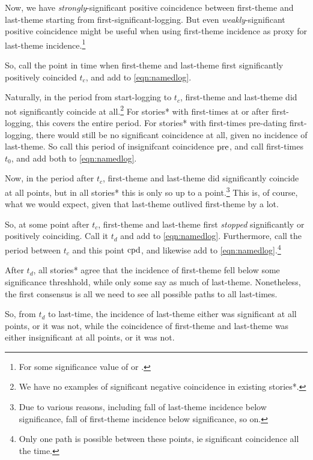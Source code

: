 			Now, we have \emph{strongly}-significant positive coincidence between first-theme and last-theme starting from first-significant-logging. But even \emph{weakly}-significant positive coincidence might be useful when using first-theme incidence as proxy for last-theme incidence.\footnote{For some significance value of  or .}
			
			So, call the point in time when first-theme and last-theme first significantly positively coincided \(t_c\), and add to \ref{eqn:namedlog}.
			
			Naturally, in the period from start-logging to \(t_c\), first-theme and last-theme did not significantly coincide at all.\footnote{We have no examples of significant negative coincidence in existing stories*.} For stories* with first-times at or after first-logging, this covers the entire period. For stories* with first-times pre-dating first-logging, there would still be no significant coincidence at all, given no incidence of last-theme. So call this period of insignifcant coincidence \(\operatorname{pre}\), and call first-times \(t_0\), and add both to \ref{eqn:namedlog}.
			
			Now, in the period after \(t_c\), first-theme and last-theme did significantly coincide at all points, but in all stories* this is only so up to a point.\footnote{Due to various reasons, including fall of last-theme incidence below significance, fall of first-theme incidence below significance, so on.} This is, of course, what we would expect, given that last-theme outlived first-theme by a lot.
			
			So, at some point after \(t_c\), first-theme and last-theme first \emph{stopped} significantly or positively coinciding. Call it \(t_d\) and add to \ref{eqn:namedlog}. Furthermore, call the period between \(t_c\) and this point \(\operatorname{cpd}\), and likewise add to \ref{eqn:namedlog}.\footnote{Only one path is possible between these points, ie significant coincidence all the time.}
			
			After \(t_d\), all stories* agree that the incidence of first-theme fell below some significance threshhold, while only some say as much of last-theme. Nonetheless, the first consensus is all we need to see all possible paths to all last-times.
			
			So, from \(t_d\) to last-time, the incidence of last-theme either was significant at all points, or it was not, while the coincidence of first-theme and last-theme was either insignificant at all points, or it was not.
			
